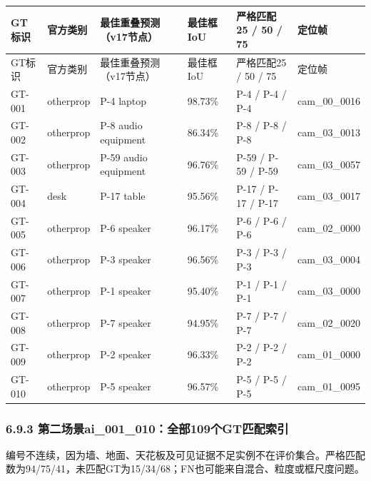 \documentclass[UTF8,fontset=fandol]{ctexart}
\begin{document}
{\small
\begin{longtable}{|p{}|p{}|p{}|p{}|p{}|p{}|}
\hline
GT标识 & 官方类别 & 最佳重叠预测（v17节点） & 最佳框IoU & 严格匹配25 / 50 / 75 & 定位帧 \\ \hline
\endfirsthead
\hline
GT标识 & 官方类别 & 最佳重叠预测（v17节点） & 最佳框IoU & 严格匹配25 / 50 / 75 & 定位帧 \\ \hline
\endhead
GT-001 & otherprop & P-4 laptop & 98.73\% & P-4 / P-4 / P-4 & cam\_00\_0016 \\ \hline
GT-002 & otherprop & P-8 audio equipment & 86.34\% & P-8 / P-8 / P-8 & cam\_03\_0013 \\ \hline
GT-003 & otherprop & P-59 audio equipment & 96.76\% & P-59 / P-59 / P-59 & cam\_03\_0057 \\ \hline
GT-004 & desk & P-17 table & 95.56\% & P-17 / P-17 / P-17 & cam\_03\_0017 \\ \hline
GT-005 & otherprop & P-6 speaker & 96.17\% & P-6 / P-6 / P-6 & cam\_02\_0000 \\ \hline
GT-006 & otherprop & P-3 speaker & 96.56\% & P-3 / P-3 / P-3 & cam\_03\_0004 \\ \hline
GT-007 & otherprop & P-1 speaker & 95.40\% & P-1 / P-1 / P-1 & cam\_03\_0000 \\ \hline
GT-008 & otherprop & P-7 speaker & 94.95\% & P-7 / P-7 / P-7 & cam\_02\_0020 \\ \hline
GT-009 & otherprop & P-2 speaker & 96.33\% & P-2 / P-2 / P-2 & cam\_01\_0000 \\ \hline
GT-010 & otherprop & P-5 speaker & 96.57\% & P-5 / P-5 / P-5 & cam\_01\_0095 \\ \hline
\end{longtable}
}

\subsubsection*{6.9.3 第二场景ai\_001\_010：全部109个GT匹配索引}

编号不连续，因为墙、地面、天花板及可见证据不足实例不在评价集合。严格匹配数为94/75/41，未匹配GT为15/34/68；FN也可能来自混合、粒度或框尺度问题。
\end{document}
